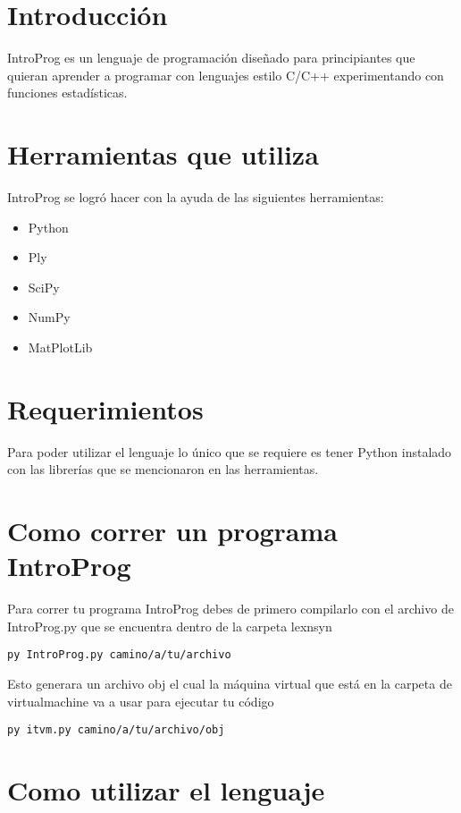 \section{Introducción}

IntroProg es un lenguaje de programación diseñado para principiantes que quieran aprender a programar con lenguajes estilo C/C++ experimentando con funciones estadísticas.

\section{Herramientas que utiliza}
IntroProg se logró hacer con la ayuda de las siguientes herramientas:
\begin{itemize}
\item Python
\item Ply
\item SciPy
\item NumPy
\item MatPlotLib
\end{itemize}
\section{Requerimientos}

Para poder utilizar el lenguaje lo único que se requiere es tener Python instalado con las librerías que se mencionaron en las herramientas.

\section{Como correr un programa IntroProg}

Para correr tu programa IntroProg debes de primero compilarlo con el archivo de IntroProg.py que se encuentra dentro de la carpeta lexnsyn
\begin{lstlisting}
py IntroProg.py camino/a/tu/archivo
\end{lstlisting}

Esto generara un archivo obj el cual la máquina virtual que está en la carpeta de virtualmachine va a usar para ejecutar tu código

\begin{lstlisting}
py itvm.py camino/a/tu/archivo/obj
\end{lstlisting}

\section{Como utilizar el lenguaje}

